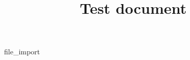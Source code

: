 \documentclass[]{memoir}
\title{Test document}
\begin{document}
\maketitle




{file_import}
\end{document}
